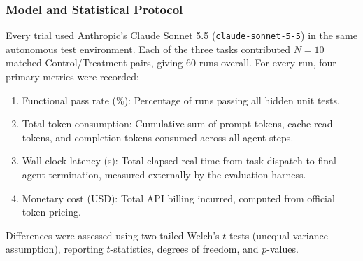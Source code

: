\documentclass[aps,onecolumn,10pt,superscriptaddress,floatfix,nofootinbib]{revtex4}
\begin{document}
\subsubsection{Model and Statistical Protocol}
Every trial used Anthropic's Claude Sonnet 5.5 (\texttt{claude-sonnet-5-5}) in the same autonomous test environment. Each of the three tasks contributed $N = 10$ matched Control/Treatment pairs, giving 60 runs overall. For every run, four primary metrics were recorded:
\begin{enumerate}
    \item {Functional pass rate (\%):} Percentage of runs passing all hidden unit tests.
    \item {Total token consumption:} Cumulative sum of prompt tokens, cache-read tokens, and completion tokens consumed across all agent steps.
    \item {Wall-clock latency (s):} Total elapsed real time from task dispatch to final agent termination, measured externally by the evaluation harness.
    \item {Monetary cost (USD):} Total API billing incurred, computed from official token pricing.
\end{enumerate}
Differences were assessed using two-tailed Welch's $t$-tests (unequal variance assumption), reporting $t$-statistics, degrees of freedom, and $p$-values.
\end{document}
